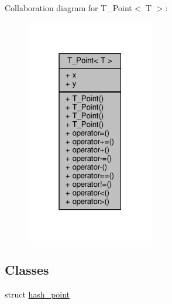 Collaboration diagram for T\+\_\+\+Point$<$ T $>$\+:
\nopagebreak
\begin{figure}[H]
\begin{center}
\leavevmode
\includegraphics[width=159pt]{classT__Point__coll__graph}
\end{center}
\end{figure}
\subsection*{Classes}
\begin{DoxyCompactItemize}
\item 
struct \hyperlink{structT__Point_1_1hash__point}{hash\+\_\+point}
\end{DoxyCompactItemize}
